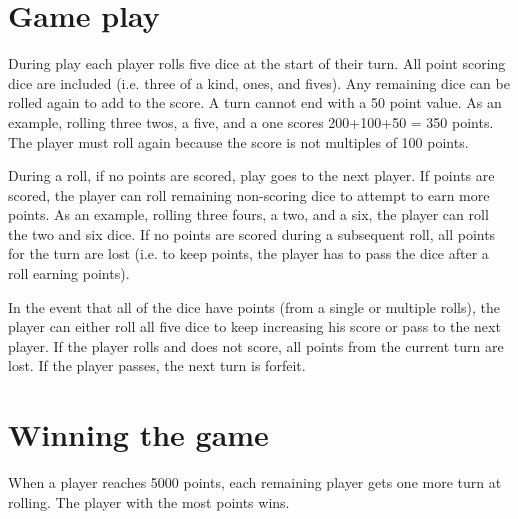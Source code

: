 \documentclass[twocolumn,12pt]{article}
\begin{document}
\section*{Game play}
During play each player rolls five dice at the start of their turn.  All point
scoring dice are included (i.e. three of a kind, ones, and fives). Any
remaining dice can be rolled again to add to the score.  A turn cannot end
with a 50 point value.  As an example, rolling three twos, a five, and a one
scores 200+100+50 = 350 points.  The player must roll again because the score is
not multiples of 100 points.

During a roll, if no points are scored, play goes to the next player.  If
points are scored, the player can roll remaining non-scoring dice to
attempt to earn more points. As
an example, rolling three fours, a two, and a six, the player can roll the
two and six dice.  If no points are scored during a subsequent roll, all points for
the turn are lost (i.e. to keep points, the player has to pass the dice after
a roll earning points). 

In the event that all of the dice have points (from a single or multiple
rolls), the player can either roll all five dice to keep increasing his score
or pass to the next player. If the player rolls and does not score, all points
from the current turn are lost.  If the player passes, the next turn is
forfeit.

\section*{Winning the game}
When a player reaches 5000 points, each
remaining player gets one more turn at rolling. The player with the most
points wins.
\end{document}

